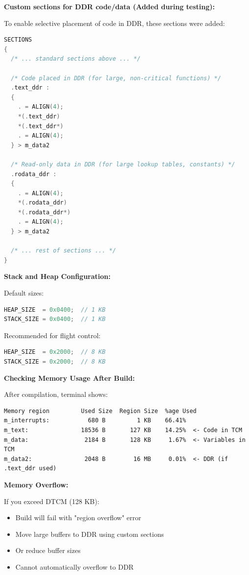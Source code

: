 \documentclass[12pt,a4paper]{report}
\begin{document}
\textbf{Custom sections for DDR code/data (Added during testing):}

To enable selective placement of code in DDR, these sections were added:

\begin{lstlisting}[language=c]
SECTIONS
{
  /* ... standard sections above ... */
  
  /* Code placed in DDR (for large, non-critical functions) */
  .text_ddr :
  {
    . = ALIGN(4);
    *(.text_ddr)
    *(.text_ddr*)
    . = ALIGN(4);
  } > m_data2

  /* Read-only data in DDR (for large lookup tables, constants) */
  .rodata_ddr :
  {
    . = ALIGN(4);
    *(.rodata_ddr)
    *(.rodata_ddr*)
    . = ALIGN(4);
  } > m_data2
  
  /* ... rest of sections ... */
}
\end{lstlisting}

\textbf{Stack and Heap Configuration:}

Default sizes:
\begin{lstlisting}[language=c]
HEAP_SIZE  = 0x0400;  // 1 KB
STACK_SIZE = 0x0400;  // 1 KB
\end{lstlisting}

Recommended for flight control:
\begin{lstlisting}[language=c]
HEAP_SIZE  = 0x2000;  // 8 KB
STACK_SIZE = 0x2000;  // 8 KB
\end{lstlisting}

\textbf{Checking Memory Usage After Build:}

After compilation, terminal shows:
\begin{lstlisting}
Memory region         Used Size  Region Size  %age Used
m_interrupts:           680 B         1 KB    66.41%
m_text:               18536 B       127 KB    14.25%  <- Code in TCM
m_data:                2184 B       128 KB     1.67%  <- Variables in TCM
m_data2:               2048 B        16 MB     0.01%  <- DDR (if .text_ddr used)
\end{lstlisting}

\begin{important}
\textbf{Memory Overflow:}

If you exceed DTCM (128 KB):
\begin{itemize}
    \item Build will fail with "region overflow" error
    \item Move large buffers to DDR using custom sections
    \item Or reduce buffer sizes
    \item Cannot automatically overflow to DDR
\end{itemize}
\end{important}
\end{document}
